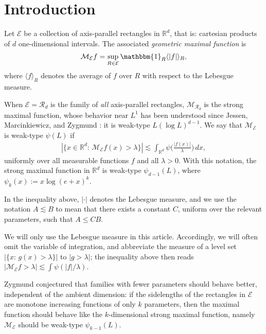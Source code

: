 \documentclass[oneside]{amsart}
\theoremstyle{definition}
\theoremstyle{plain}
\numberwithin{equation}{section}
\numberwithin{theorem}{section}
\newcommand{\ind}{\mathbbm{1}}
\begin{document}
\tableofcontents

\section{Introduction}

Let $\mathcal{E}$ be a collection of axis-parallel rectangles in $\mathbb{R}^d$,
that is: cartesian products of $d$ one-dimensional intervals.
The associated \emph{geometric maximal function} is
\begin{align*}
  \mathcal{M}_{\mathcal{E}}f = \sup_{R \in \mathcal{E}}
    \ind_R \langle |f| \rangle_R,
\end{align*}
where $\langle f \rangle_R$ denotes the average of $f$ over $R$ with respect to
the Lebesgue measure.

When $\mathcal{E} = \mathcal{R}_d$ is the family of \emph{all} axis-parallel
rectangles, $\mathcal{M}_{\mathcal{R}_d}$ is the strong maximal function, whose
behavior near $L^1$ has been understood since Jessen, Marcinkiewicz, and Zygmund
\cite{JMZ1935}: it is weak-type $L(\log L)^{d-1}$.
We say that $\mathcal{M}_{\mathcal{E}}$ is weak-type $\psi(L)$ if
\begin{align*}
  |\{x \in \mathbb{R}^d: \, \mathcal{M}_{\mathcal{E}}f(x) > \lambda \}| \lesssim
    \int_{\mathbb{R}^d} \psi \bigg( \frac{|f(x)|}{\lambda} \bigg) \, dx,
\end{align*}
uniformly over all measurable functions $f$ and all $\lambda > 0$.
With this notation, the strong maximal function in $\mathbb{R}^d$
is weak-type $\psi_{d-1}(L)$, where $\psi_{k}(x) := x\log(e+x)^k$.

In the inequality above, $|\cdot|$ denotes the Lebesgue measure,
and we use the notation $A \lesssim B$ to mean that there exists a constant $C$,
uniform over the relevant parameters, such that $A \leq CB$.

We will only use the Lebesgue measure in this article.
Accordingly, we will often omit the variable of integration, and abbreviate
the measure of a level set $|\{x:\, g(x) > \lambda\}|$ to $|g > \lambda|$;
the inequality above then reads
$|\mathcal{M}_{\mathcal{E}}f > \lambda| \lesssim \int \psi(|f|/\lambda)$.

Zygmund conjectured that families with fewer parameters should behave better,
independent of the ambient dimension:
if the sidelengths of the rectangles in $\mathcal{E}$ are monotone increasing
functions of only $k$ parameters, then the maximal function should behave like
the $k$-dimensional strong maximal function, namely
$\mathcal{M}_{\mathcal{E}}$ should be weak-type $\psi_{k-1}(L)$.
\end{document}
